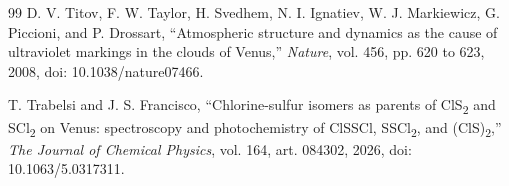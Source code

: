 \begin{thebibliography}{99}
D. V. Titov, F. W. Taylor, H. Svedhem, N. I. Ignatiev, W. J. Markiewicz, G. Piccioni,
and P. Drossart, ``Atmospheric structure and dynamics as the cause of ultraviolet
markings in the clouds of Venus,'' \emph{Nature}, vol. 456, pp. 620 to 623, 2008,
doi: 10.1038/nature07466.

T. Trabelsi and J. S. Francisco, ``Chlorine-sulfur isomers as parents of
ClS\textsubscript{2} and SCl\textsubscript{2} on Venus: spectroscopy and photochemistry
of ClSSCl, SSCl\textsubscript{2}, and (ClS)\textsubscript{2},'' \emph{The Journal of
Chemical Physics}, vol. 164, art. 084302, 2026, doi: 10.1063/5.0317311.

\end{thebibliography}
